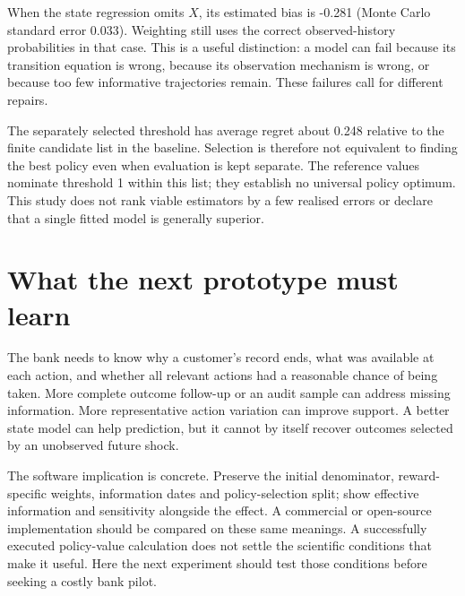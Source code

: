 When the state regression omits $X$, its estimated bias is -0.281 (Monte
Carlo standard error 0.033). Weighting still uses the correct observed-history
probabilities in that case. This is a useful distinction: a model can fail
because its transition equation is wrong, because its observation mechanism
is wrong, or because too few informative trajectories remain. These failures
call for different repairs.

The separately selected threshold has average regret about 0.248 relative
to the finite candidate list in the baseline. Selection is therefore not
equivalent to finding the best policy even when evaluation is kept separate.
The reference values nominate threshold 1 within this list; they establish
no universal policy optimum. This study does not rank viable estimators by
a few realised errors or declare that a single fitted model is generally
superior.

\section{What the next prototype must learn}
The bank needs to know why a customer's record ends, what was available at
each action, and whether all relevant actions had a reasonable chance of
being taken. More complete outcome follow-up or an audit sample can address
missing information. More representative action variation can improve
support. A better state model can help prediction, but it cannot by itself
recover outcomes selected by an unobserved future shock.

The software implication is concrete. Preserve the initial denominator,
reward-specific weights, information dates and policy-selection split; show
effective information and sensitivity alongside the effect. A commercial or
open-source implementation should be compared on these same meanings. A
successfully executed policy-value calculation does not settle the scientific
conditions that make it useful. Here the next experiment should test those
conditions before seeking a costly bank pilot.

